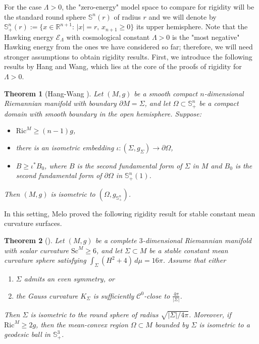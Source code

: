 \documentclass[12pt,a4paper]{amsart}
\theoremstyle{plain}
\newtheorem{theorem}{Theorem}[section]
\theoremstyle{definition}
\begin{document}
For the case $\Lambda > 0$, the "zero-energy" model space to compare for rigidity  will be the standard round sphere  $\mathbb{S}^n(r)$ of radius $r$ and we will denote by $\mathbb{S}_+^n(r):=\{x\in \mathbb{R}^{n+1} : \, |x|=r, \, x_{n+1} \geq 0  \}$ its upper hemisphere. Note that the Hawking energy $ \mathcal{E}_{\Lambda}$ with cosmological constant $\Lambda > 0$ is the "most negative" Hawking energy from the ones we have considered so far; therefore, we will need stronger assumptions to obtain rigidity results.  First, we introduce the following results by Hang and Wang, which lies at the core of the proofs of rigidity for $\Lambda >0$. 
\begin{theorem}[Hang-Wang {\cite[Theorem 3]{hang2009rigidity}}]\label{hangwang3}
Let $(M,g)$ be a smooth compact $n$-dimensional Riemannian manifold with boundary $\partial M = \Sigma$, and let $\Omega \subset \mathbb{S}^n_+$ be a compact domain with smooth boundary in the open hemisphere. Suppose:
\begin{itemize}
    \item $\mathrm{Ric}^M \ge (n-1)g$,
    \item there is an isometric embedding $\iota \colon (\Sigma, g_\Sigma) \to \partial\Omega$,
    \item $B \ge \iota^*B_0$, where $B$ is the second fundamental form of $\Sigma$ in $M$ and $B_0$ is the second fundamental form of $\partial\Omega$ in $\mathbb{S}^n_+(1)$.
\end{itemize}
Then $(M,g)$ is isometric to $(\Omega, g_{\mathbb{S}^n_+})$.
\end{theorem}
In this setting,  Melo proved the following rigidity result for stable constant mean curvature surfaces.
\begin{theorem}[{\cite[Theorem 1.1, Theorem 1.2]{melo2024hawking}}] Let $(M,g)$ be a complete $3$-dimensional Riemannian manifold with scalar curvature $\mathrm{Sc}^M \ge 6$, and let $\Sigma\subset M$ be a stable constant mean curvature sphere satisfying $ \int_\Sigma (H^2+4)\,d\mu = 16\pi$.  Assume that either \begin{enumerate} \item[(i)] $\Sigma$ admits an even symmetry, or \item[(ii)] the Gauss curvature $K_\Sigma$ is sufficiently $\mathcal C^0$-close to $\frac{4\pi}{|\Sigma|}$. \end{enumerate} Then $\Sigma$ is isometric to the round sphere of radius  \( \sqrt{|\Sigma|/ 4\pi} \). Moreover, if $\mathrm{Ric}^M\ge 2g$, then the mean-convex region $\Omega\subset M$ bounded by $\Sigma$ is isometric to a geodesic ball in $\mathbb S^3_+$.
\end{theorem}
\end{document}
